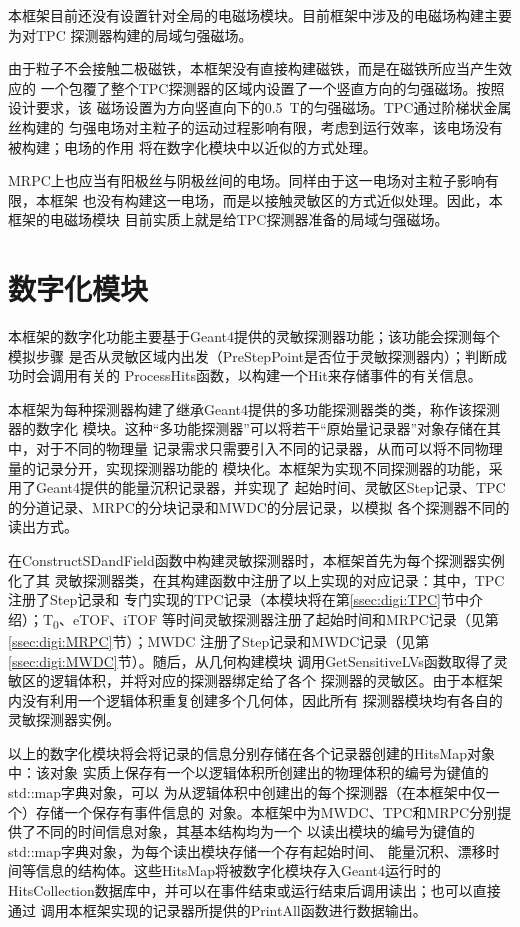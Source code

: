 \documentclass[bachelor,openany,oneside,color]{buaathesis}
\def\TZ{T\textsubscript{0}}
\begin{document}
本框架目前还没有设置针对全局的电磁场模块。目前框架中涉及的电磁场构建主要为对TPC
探测器构建的局域匀强磁场。

由于粒子不会接触二极磁铁，本框架没有直接构建磁铁，而是在磁铁所应当产生效应的
一个包覆了整个TPC探测器的区域内设置了一个竖直方向的匀强磁场。按照设计要求，该
磁场设置为方向竖直向下的\SI{0.5}{\tesla}的匀强磁场。TPC通过阶梯状金属丝构建的
匀强电场对主粒子的运动过程影响有限，考虑到运行效率，该电场没有被构建；电场的作用
将在数字化模块中以近似的方式处理。

MRPC上也应当有阳极丝与阴极丝间的电场。同样由于这一电场对主粒子影响有限，本框架
也没有构建这一电场，而是以接触灵敏区的方式近似处理。因此，本框架的电磁场模块
目前实质上就是给TPC探测器准备的局域匀强磁场。

\section{数字化模块}

本框架的数字化功能主要基于Geant4提供的灵敏探测器功能；该功能会探测每个模拟步骤
是否从灵敏区域内出发（PreStepPoint是否位于灵敏探测器内）；判断成功时会调用有关的
ProcessHits函数，以构建一个Hit来存储事件的有关信息。\cite{Geant4}

本框架为每种探测器构建了继承Geant4提供的多功能探测器类的类，称作该探测器的数字化
模块。这种“多功能探测器”可以将若干“原始量记录器”对象存储在其中，对于不同的物理量
记录需求只需要引入不同的记录器，从而可以将不同物理量的记录分开，实现探测器功能的
模块化。本框架为实现不同探测器的功能，采用了Geant4提供的能量沉积记录器，并实现了
起始时间、灵敏区Step记录、TPC的分道记录、MRPC的分块记录和MWDC的分层记录，以模拟
各个探测器不同的读出方式。

在ConstructSDandField函数中构建灵敏探测器时，本框架首先为每个探测器实例化了其
灵敏探测器类，在其构建函数中注册了以上实现的对应记录：其中，TPC注册了Step记录和
专门实现的TPC记录（本模块将在第\ref{ssec:digi:TPC}节中介绍）；\TZ、eTOF、iTOF
等时间灵敏探测器注册了起始时间和MRPC记录（见第\ref{ssec:digi:MRPC}节）；MWDC
注册了Step记录和MWDC记录（见第\ref{ssec:digi:MWDC}节）。随后，从几何构建模块
调用GetSensitiveLVs函数取得了灵敏区的逻辑体积，并将对应的探测器绑定给了各个
探测器的灵敏区。由于本框架内没有利用一个逻辑体积重复创建多个几何体，因此所有
探测器模块均有各自的灵敏探测器实例。

以上的数字化模块将会将记录的信息分别存储在各个记录器创建的HitsMap对象中：该对象
实质上保存有一个以逻辑体积所创建出的物理体积的编号为键值的std::map字典对象，可以
为从逻辑体积中创建出的每个探测器（在本框架中仅一个）存储一个保存有事件信息的
对象。本框架中为MWDC、TPC和MRPC分别提供了不同的时间信息对象，其基本结构均为一个
以读出模块的编号为键值的std::map字典对象，为每个读出模块存储一个存有起始时间、
能量沉积、漂移时间等信息的结构体。这些HitsMap将被数字化模块存入Geant4运行时的
HitsCollection数据库中，并可以在事件结束或运行结束后调用读出；也可以直接通过
调用本框架实现的记录器所提供的PrintAll函数进行数据输出。
\end{document}
